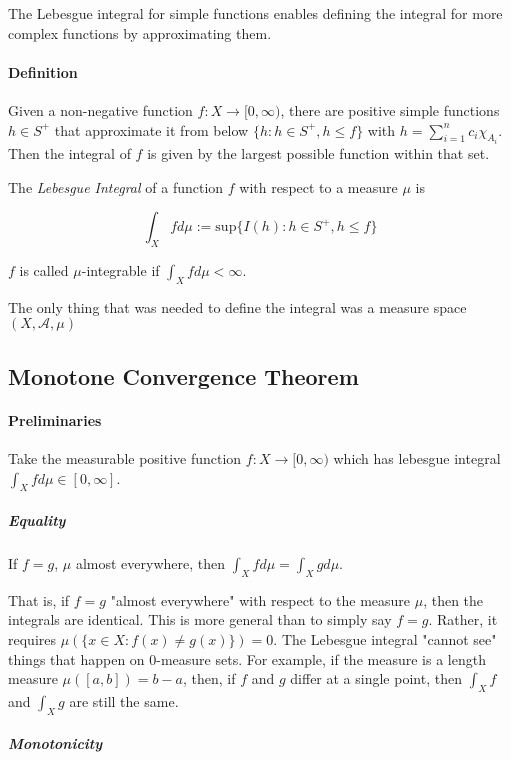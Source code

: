 The Lebesgue integral for simple functions enables defining the integral for more complex functions by approximating them.

\paragraph{Definition} 
Given a non-negative function $f:X \rightarrow [0,\infty)$, there are positive simple functions $h\in S^+$ that approximate it from below $\{h: h\in S^+, h\leq f\}$ with $h=\sum_{i=1}^n c_i \chi_{A_i}$. Then the integral of $f$ is given by the largest possible function within that set.

The \textit{Lebesgue Integral} of a function $f$ with respect to a measure $\mu$ is

\begin{equation}
\int_X f d\mu := \mathrm{sup}\{ I(h) : h\in S^+, h\leq f \}
\end{equation}

$f$ is called $\mu$-integrable if $\int_X f d\mu < \infty$.

The only thing that was needed to define the integral was a measure space $(X,\mathscr{A},\mu)$


\subsection{Monotone Convergence Theorem}

\paragraph{Preliminaries}

Take the measurable positive function $f: X\rightarrow [0,\infty)$ which has lebesgue integral $\int_X f d\mu \in [0,\infty]$. 


\subparagraph{Equality}
If $f=g$, $\mu$ almost everywhere, then $\int_X f d\mu = \int_X g d\mu$. 

That is, if $f=g$ "almost everywhere" with respect to the measure $\mu$, then the integrals are identical. This is more general than to simply say $f=g$. Rather, it requires $\mu(\{x \in X: f(x) \neq g(x) \}) = 0$. The Lebesgue integral "cannot see" things that happen on $0$-measure sets. For example, if the measure is a length measure $\mu ( [a,b] ) = b-a$, then, if $f$ and $g$ differ at a single point, then $\int_X f $ and $\int_X g$ are still the same. 

\subparagraph{Monotonicity}

